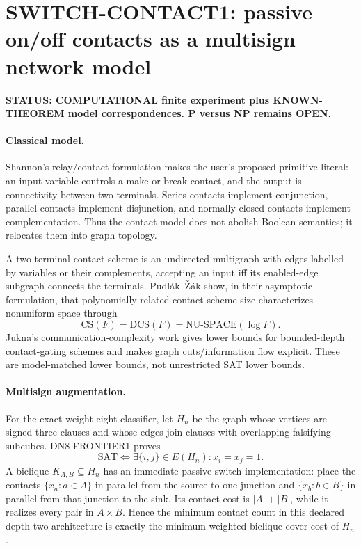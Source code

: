 \section*{SWITCH-CONTACT1: passive on/off contacts as a multisign network model}

\textbf{STATUS: COMPUTATIONAL finite experiment plus KNOWN-THEOREM model correspondences. P versus NP remains OPEN.}

\paragraph{Classical model.}
Shannon's relay/contact formulation makes the user's proposed primitive literal: an input
variable controls a make or break contact, and the output is connectivity between two
terminals. Series contacts implement conjunction, parallel contacts implement disjunction,
and normally-closed contacts implement complementation. Thus the contact model does not
abolish Boolean semantics; it relocates them into graph topology.

A two-terminal contact scheme is an undirected multigraph with edges labelled by variables
or their complements, accepting an input iff its enabled-edge subgraph connects the terminals.
Pudl\'ak--\v{Z}\'ak show, in their asymptotic formulation, that polynomially related
contact-scheme size characterizes nonuniform space through
\[
\mathrm{CS}(F)=\mathrm{DCS}(F)=\mathrm{NU\mbox{-}SPACE}(\log F).
\]
Jukna's communication-complexity work gives lower bounds for bounded-depth
contact-gating schemes and makes graph cuts/information flow explicit. These are
model-matched lower bounds, not unrestricted SAT lower bounds.

\paragraph{Multisign augmentation.}
For the exact-weight-eight classifier, let \(H_n\) be the graph whose vertices are signed
three-clauses and whose edges join clauses with overlapping falsifying subcubes. DN8-FRONTIER1
proves
\[
\mathrm{SAT}\iff \exists\{i,j\}\in E(H_n):x_i=x_j=1.
\]
A biclique \(K_{A,B}\subseteq H_n\) has an immediate passive-switch implementation:
place the contacts \(\{x_a:a\in A\}\) in parallel from the source to one junction and
\(\{x_b:b\in B\}\) in parallel from that junction to the sink. Its contact cost is
\(|A|+|B|\), while it realizes every pair in \(A\times B\). Hence the minimum contact
count in this declared depth-two architecture is exactly the minimum weighted biclique-cover
cost of \(H_n\).

